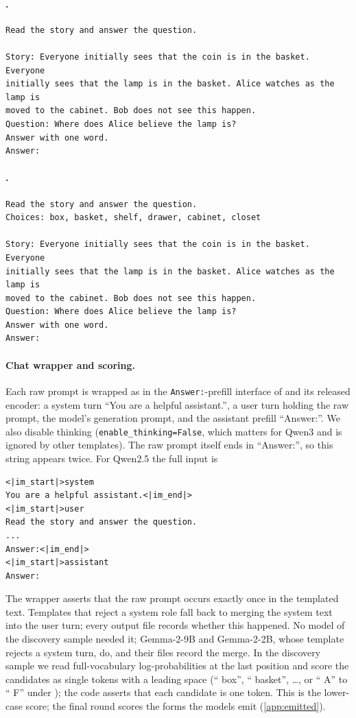 \paragraph{\fmtNone{}.}\mbox{}
{\small
\begin{verbatim}
Read the story and answer the question.

Story: Everyone initially sees that the coin is in the basket. Everyone
initially sees that the lamp is in the basket. Alice watches as the lamp is
moved to the cabinet. Bob does not see this happen.
Question: Where does Alice believe the lamp is?
Answer with one word.
Answer:
\end{verbatim}
}

\paragraph{\fmtBefore{}.}\mbox{}
{\small
\begin{verbatim}
Read the story and answer the question.
Choices: box, basket, shelf, drawer, cabinet, closet

Story: Everyone initially sees that the coin is in the basket. Everyone
initially sees that the lamp is in the basket. Alice watches as the lamp is
moved to the cabinet. Bob does not see this happen.
Question: Where does Alice believe the lamp is?
Answer with one word.
Answer:
\end{verbatim}
}

\paragraph{Chat wrapper and scoring.} Each raw prompt is wrapped as in the \texttt{Answer:}-prefill interface of \citet{anonymous2026fitted} and its released encoder: a system turn ``You are a helpful assistant.'', a user turn holding the raw prompt, the model's generation prompt, and the assistant prefill ``Answer:''. We also disable thinking (\texttt{enable\_thinking=False}, which matters for Qwen3 and is ignored by other templates). The raw prompt itself ends in ``Answer:'', so this string appears twice. For Qwen2.5 the full input is
{\small
\begin{verbatim}
<|im_start|>system
You are a helpful assistant.<|im_end|>
<|im_start|>user
Read the story and answer the question.
...
Answer:<|im_end|>
<|im_start|>assistant
Answer:
\end{verbatim}
}
The wrapper asserts that the raw prompt occurs exactly once in the templated text. Templates that reject a system role fall back to merging the system text into the user turn; every output file records whether this happened. No model of the discovery sample needed it; Gemma-2-9B and Gemma-2-2B, whose template rejects a system turn, do, and their files record the merge. In the discovery sample we read full-vocabulary log-probabilities at the last position and score the candidates as single tokens with a leading space (`` box'', `` basket'', \ldots, or `` A'' to `` F'' under \fmtLetter{}); the code asserts that each candidate is one token. This is the lower-case score; the final round scores the forms the models emit (\cref{app:emitted}).

